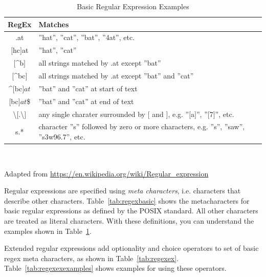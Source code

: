 \begin{advanced}
\begin{table}[h]
\caption{Basic Regular Expressions}
\label{tab:regexbasic}
\end{table}

\begin{table}[h]
\small 
\centering

\renewcommand{\arraystretch}{1.25}

\begin{tabularx}{\textwidth}{c|X} \hline
{\bf RegEx} & {\bf Matches} \\ \hline \hline
.at & ''hat'', ''cat'', ''bat'', ''4at'', etc. \\ \hline
$[$hc$]$at & ''hat'', ''cat'' \\ \hline
$[$\^{ }b$]$ & all strings matched by .at except ''bat'' \\ \hline
$[$\^{ }bc$]$ & all strings matched by .at except ''bat'' and ''cat'' \\ \hline
\^{ }$[$bc$]at$ & ''bat'' and ''cat'' at start of text \\ \hline
$[$bc$]at$\$ & ''bat'' and ''cat'' at end of text \\ \hline
\textbackslash $[$.\textbackslash$]$ & any single charater surrounded by $[$ and $]$, e.g. ''$[$a$]$'', ''$[$7$]$'', etc. \\ \hline
s.* & character ''s'' followed by zero or more characters, e.g. ''s'', ''saw'', ''s3w96.7'', etc. \\ \hline
\end{tabularx} \\
\vspace{.5\baselineskip}

{\footnotesize Adapted from \url{https://en.wikipedia.org/wiki/Regular_expression}} 

\caption{Basic Regular Expression Examples}
\label{tab:regexbasicexamples}
\end{table}

Regular expressions are specified using \emph{meta characters}, i.e. characters that describe other characters. Table~\ref{tab:regexbasic} shows the metacharacters for basic regular expressions as defined by the POSIX standard. All other characters are treated as literal characters. With these definitions, you can understand the examples shown in Table~\ref{tab:regexbasicexamples}.

Extended regular expressions add optionality and choice operators to set of basic regex meta characters, as shown in Table~\ref{tab:regexex}. Table~\ref{tab:regexexexamples} shows examples for using these operators.


\end{advanced}
